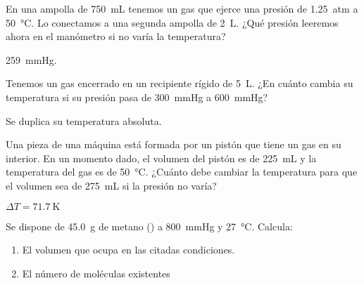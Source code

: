 \documentclass[10pt,a5paper,twoside]{article}
\begin{document}
  \begin{exercise}[
      tags    = {termodinámica, entalpía, entalpia de reacción, calor},
      topics  = {química, termoquímica, termodinámica},
      source  = {FQ 1B SAN 2015, p66, e37},
    ]
    En una ampolla de \SI{750}{\milli\liter} tenemos un gas que ejerce una presión de \SI{1.25}{atm} a \SI{50}{\celsius}. Lo conectamos a una segunda ampolla de \SI{2}{\liter}. ¿Qué presión leeremos ahora en el manómetro si no varía la temperatura?
  \end{exercise}

  \begin{solution}
    \SI{259}{\mmHg}.
  \end{solution}



  \begin{exercise}[
      tags    = {termodinámica, entalpía, entalpia de reacción, calor},
      topics  = {química, termoquímica, termodinámica},
      source  = {FQ 1B SAN 2015, p66, e39},
    ]
    Tenemos un gas encerrado en un recipiente rígido de \SI{5}{\liter}. ¿En cuánto cambia su temperatura si su presión pasa de \SI{300}{\mmHg} a \SI{600}{\mmHg}?
  \end{exercise}

  \begin{solution}
    Se duplica su temperatura absoluta.
  \end{solution}




  \begin{exercise}[
      tags    = {termodinámica, entalpía, entalpia de reacción, calor},
      topics  = {química, termoquímica, termodinámica},
      source  = {FQ 1B SAN 2015, p66, e39},
    ]
    Una pieza de una máquina está formada por un pistón que tiene un gas en su interior. En un momento dado, el volumen del pistón es de \SI{225}{\milli\liter} y la temperatura del gas es de \SI{50}{\celsius}. ¿Cuánto debe cambiar la temperatura para que el volumen sea de \SI{275}{\milli\liter} si la presión no varía?
  \end{exercise}

  \begin{solution}
    \( \Delta T = \SI{+71.7}{\kelvin} \)
  \end{solution}




  \begin{exercise}[
      tags    = {termodinámica, entalpía, entalpia de reacción, calor},
      topics  = {química, termoquímica, termodinámica},
      source  = {FQ 1B OXF 2015, p60, e22},
    ]
    Se dispone de \SI{45.0}{\gram} de metano () a \SI{800}{\mmHg} y \SI{27}{\celsius}. Calcula:
    \begin{enumerate}
      \item El volumen que ocupa en las citadas condiciones.
      \item El número de moléculas existentes
    \end{enumerate}
  \end{exercise}
\end{document}
